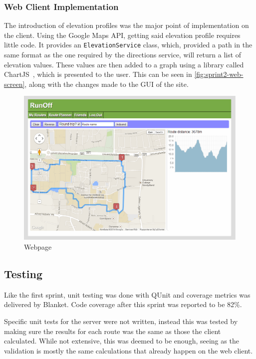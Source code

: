 \subsubsection{Web Client Implementation}
The introduction of elevation profiles was the major point of implementation on the client. Using the Google Maps \ac{API}, getting said elevation profile requires little code. It provides an \texttt{ElevationService} class, which, provided a path in the same format as the one required by the directions service, will return a list of elevation values. These values are then added to a graph using a library called ChartJS~\cite{chartjs}, which is presented to the user. This can be seen in \autoref{fig:sprint2-web-screen}, along with the changes made to the \ac{GUI} of the site.

\begin{figure}[!ht]
	\centering
	\includegraphics[width=\textwidth]{img/webplanner2.png}
	\caption{Webpage}
	\label{fig:sprint2-web-screen}
\end{figure}

\subsection{Testing}
Like the first sprint, unit testing was done with QUnit and coverage metrics was delivered by Blanket. Code coverage after this sprint was reported to be 82\%.

Specific unit tests for the server were not written, instead this was tested by making sure the results for each route was the same as those the client calculated. While not extensive, this was deemed to be enough, seeing as the validation is mostly the same calculations that already happen on the web client.
